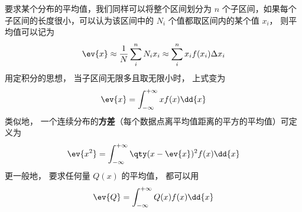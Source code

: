 要求某个分布的平均值，我们同样可以将整个区间划分为 $n$ 个子区间，如果每个子区间的长度很小，可以认为该区间中的 $N_i$ 个值都取区间内的某个值 $x_i$， 则平均值可以记为
\begin{equation}
\ev{x} \approx \frac1N \sum_i^n N_i x_i \approx \sum_i^n x_i f(x_i)\Delta x_i
\end{equation}
用定积分的思想， 当子区间无限多且取无限小时， 上式变为
\begin{equation}
\ev{x} = \int_{-\infty}^{+\infty} x f(x) \dd{x}
\end{equation}
类似地， 一个连续分布的\textbf{方差}（每个数据点离平均值距离的平方的平均值）可定义为
\begin{equation}
\ev{x^2} = \int_{-\infty}^{+\infty} \qty(x-\ev{x})^2 f(x) \dd{x}
\end{equation}
更一般地， 要求任何量 $Q(x)$ 的平均值， 都可以用
\begin{equation}
\ev{Q} = \int_{-\infty}^{+\infty} Q(x) f(x) \dd{x}
\end{equation}